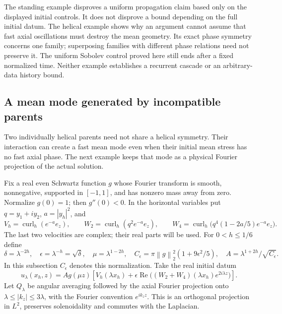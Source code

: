 \documentclass[11pt]{article}
\theoremstyle{remark}
\newcommand{\norm}[1]{\left\lVert#1\right\rVert}
\newcommand{\curl}{\operatorname{curl}}
\begin{document}
The standing example disproves a uniform propagation claim based only
on the displayed initial controls. It does not disprove a bound depending
on the full initial datum. The helical example shows why an argument
cannot assume that fast axial oscillations must destroy the mean geometry.
Its exact phase symmetry concerns one family; superposing families with
different phase relations need not preserve it. The uniform Sobolev
control proved here still ends after a fixed normalized time. Neither
example establishes a recurrent cascade or an arbitrary-data history bound.

\subsection{A mean mode generated by incompatible parents}

Two individually helical parents need not share a helical symmetry.
Their interaction can create a fast mean mode even when their initial
mean stress has no fast axial phase. The next example keeps that mode
as a physical Fourier projection of the actual solution.

Fix a real even Schwartz function $g$ whose Fourier transform is smooth,
nonnegative, supported in $[-1,1]$, and has nonzero mass away from zero.
Normalize $g(0)=1$; then $g''(0)<0$.
In the horizontal variables put $q=y_1+i y_2$, $a=|y_h|^2$, and
\[
 V_h=\curl_h(e^{-a}e_z),\qquad
 W_2=\curl_h(q^2e^{-a}e_z),\qquad
 W_4=\curl_h\big(q^4(1-2a/5)e^{-a}e_z\big).
\]
The last two velocities are complex; their real parts will be used.
For $0<h\leq1/6$ define
\[
 \delta=\lambda^{-2h},\quad \epsilon=\lambda^{-h}=\sqrt\delta,
 \quad \mu=\lambda^{1-2h},\quad
 C_\epsilon=\pi\norm g_2^2(1+9\epsilon^2/5),\quad
 A=\lambda^{1+2h}/\sqrt{C_\epsilon}.
\]
In this subsection $C_\epsilon$ denotes this normalization. Take the
real initial datum
\begin{equation}\label{eq:mixedDatum}
 u_\lambda(x_h,z)=A g(\mu z)
   \left[V_h(\lambda x_h)+\epsilon\operatorname{Re}
        \big((W_2+W_4)(\lambda x_h)e^{2i\lambda z}\big)\right].
\end{equation}
Let $Q_\lambda$ be angular averaging followed by the axial Fourier
projection onto $\lambda\leq|k_z|\leq3\lambda$, with the Fourier
convention $e^{ik_z z}$. This is an orthogonal projection in $L^2$,
preserves solenoidality and commutes with the Laplacian.
\end{document}
